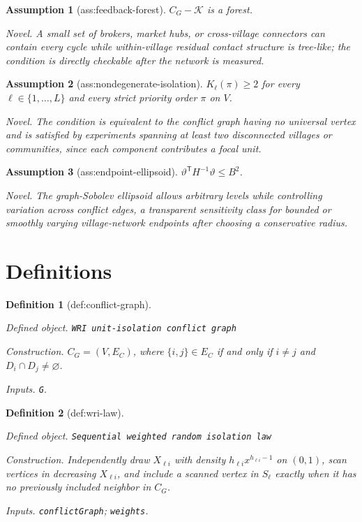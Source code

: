 \documentclass{article}
\newtheorem{assumption}{Assumption}
\newtheorem{definition}{Definition}
\begin{document}
\begin{assumption}[ass:feedback-forest]\label{ass:feedback-forest}
\(C_G-\mathcal K\) is a forest.
\par\smallskip\noindent\emph{Novel.} A small set of brokers, market hubs, or cross-village connectors can contain every cycle while within-village residual contact structure is tree-like; the condition is directly checkable after the network is measured.
\end{assumption}

\begin{assumption}[ass:nondegenerate-isolation]\label{ass:nondegenerate-isolation}
\(K_{\ell}(\pi)\ge 2\) for every \(\ell\in\{1,\ldots,L\}\) and every strict priority order \(\pi\) on \(V\).
\par\smallskip\noindent\emph{Novel.} The condition is equivalent to the conflict graph having no universal vertex and is satisfied by experiments spanning at least two disconnected villages or communities, since each component contributes a focal unit.
\end{assumption}

\begin{assumption}[ass:endpoint-ellipsoid]\label{ass:endpoint-ellipsoid}
\(\vartheta^{\mathsf T}H^{-1}\vartheta\le B^2\).
\par\smallskip\noindent\emph{Novel.} The graph-Sobolev ellipsoid allows arbitrary levels while controlling variation across conflict edges, a transparent sensitivity class for bounded or smoothly varying village-network endpoints after choosing a conservative radius.
\end{assumption}

\section{Definitions}

\begin{definition}[def:conflict-graph]\label{def:conflict-graph}
\par\smallskip\noindent\emph{Defined object.} \texttt{WRI unit-\allowbreak{}isolation conflict graph}
\par\smallskip\noindent\emph{Construction.} \(C_G=(V,E_C)\), where \(\{i,j\}\in E_C\) if and only if \(i\ne j\) and \(D_i\cap D_j\ne\varnothing\).
\par\smallskip\noindent\emph{Inputs.} \texttt{G}.
\end{definition}

\begin{definition}[def:wri-law]\label{def:wri-law}
\par\smallskip\noindent\emph{Defined object.} \texttt{Sequential weighted random isolation law}
\par\smallskip\noindent\emph{Construction.} Independently draw \(X_{\ell i}\) with density \(h_{\ell i}x^{h_{\ell i}-1}\) on \((0,1)\), scan vertices in decreasing \(X_{\ell i}\), and include a scanned vertex in \(S_{\ell}\) exactly when it has no previously included neighbor in \(C_G\).
\par\smallskip\noindent\emph{Inputs.} \texttt{conflictGraph}; \texttt{weights}.
\end{definition}
\end{document}
